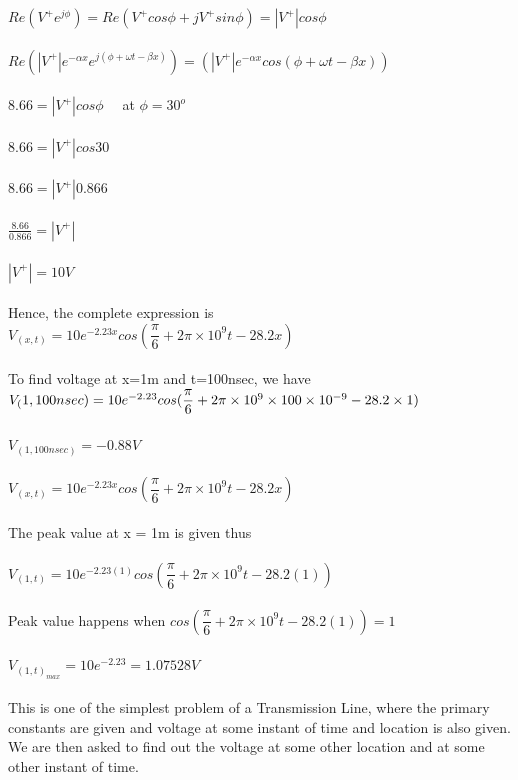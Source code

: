 \begin{exmp}
$Re({V^{+}e^{j\phi}}) = Re({V^{+}{cos\phi}} + {jV^{+}{sin\phi}}) = |V^{+}|{cos\phi}$\\\\
$Re({|V^{+}|e^{-\alpha x}e^{j(\phi+\omega t - \beta x)}}) = ({|V^{+}|e^{-\alpha x}cos{(\phi+\omega t - \beta x)}})$\\\\
$8.66 = {|V^+|{cos\phi}} \quad$ at $ \phi = 30^{o} $\\\\
$8.66 = {|V^+|{cos30}}$\\\\
$8.66 = {|V^+|{0.866}}$\\\\
$\frac{8.66}{0.866} = {|V^+|}$\\\\
${|V^{+}| = 10V}$\\\\
Hence, the complete expression is\\
$V_({x,t}) = 10e^{-2.23x} cos({\dfrac{\pi}{6} + 2\pi\times10^9t - 28.2x})$\\\\
To find voltage at x=1m and t=100nsec, we have\\
$V_({1,100nsec}) \\ = 10e^{-2.23} cos({\dfrac{\pi}{6} + 2\pi\times10^9\times100\times10^{-9} - 28.2\times1})$\\\\
$V_({1,100nsec}) = -0.88V$\\\\
$V_({x,t}) = 10e^{-2.23x} cos({\dfrac{\pi}{6} + 2\pi\times10^9t - 28.2x})$\\\\
The peak value at x = 1m is given thus\\\\
$V_({1,t}) = 10e^{-2.23(1)} cos({\dfrac{\pi}{6} + 2\pi\times10^9t - 28.2(1)})$\\\\
Peak value happens when $cos({\dfrac{\pi}{6} + 2\pi\times10^9t - 28.2(1)}) = 1$\\\\
$ V_{(1,t)_{max}} = 10e^{-2.23} = 1.07528V $\\\\
This is one of the simplest problem of a Transmission Line, where the primary constants are given and voltage at some instant of time and location is also given. We are then asked to find out the voltage at some other location and at some other instant of time.\\

\end{exmp}
